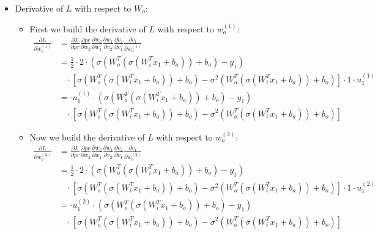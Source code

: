 \documentclass[a4paper]{article}
\begin{document}
\begin{itemize}
            \item Derivative of $L$ with respect to $W_o$:
                \begin{itemize}
                    \item First we build the derivative of $L$ with respect to $w_o^{(1)}$:
                        \begin{align*}
                            \frac{\partial L}{\partial w_o^{(1)}} &= \frac{\partial L}{\partial pr} \frac{\partial pr}{\partial w_2} 
                            \frac{\partial w_2}{\partial w_1} \frac{\partial w_1}{\partial v_2} \frac{\partial v_2}{\partial v_1}
                            \frac{\partial v_1}{\partial w_o^{(1)}}\\
                            &= \frac{1}{2} \cdot 2 \cdot (\sigma(W_o^T(\sigma(W_i^T x_1 + b_a)) + b_o) - y_1)\\
                            &\ \ \ \ \cdot [\sigma(W_o^T(\sigma(W_i^T x_1 + b_a)) + b_o) - \sigma^2(W_o^T(\sigma(W_i^T x_1 + b_a)) + b_o)] \cdot 1 \cdot u_1^{(1)}\\
                            &= \cdot u_1^{(1)} \cdot (\sigma(W_o^T(\sigma(W_i^T x_1 + b_a)) + b_o) - y_1)\\
                            &\ \ \ \ \cdot [\sigma(W_o^T(\sigma(W_i^T x_1 + b_a)) + b_o) - \sigma^2(W_o^T(\sigma(W_i^T x_1 + b_a)) + b_o)]
                        \end{align*}
                    \item Now we build the derivative of $L$ with respect to $w_o^{(2)}$:
                        \begin{align*}
                            \frac{\partial L}{\partial w_o^{(2)}} &= \frac{\partial L}{\partial pr} \frac{\partial pr}{\partial w_2} 
                            \frac{\partial w_2}{\partial w_1} \frac{\partial w_1}{\partial v_2} \frac{\partial v_2}{\partial v_1}
                            \frac{\partial v_1}{\partial w_o^{(2)}}\\
                            &= \frac{1}{2} \cdot 2 \cdot (\sigma(W_o^T(\sigma(W_i^T x_1 + b_a)) + b_o) - y_1)\\
                            &\ \ \ \ \cdot [\sigma(W_o^T(\sigma(W_i^T x_1 + b_a)) + b_o) - \sigma^2(W_o^T(\sigma(W_i^T x_1 + b_a)) + b_o)] \cdot 1 \cdot u_1^{(2)}\\
                            &= \cdot u_1^{(2)} \cdot (\sigma(W_o^T(\sigma(W_i^T x_1 + b_a)) + b_o) - y_1)\\
                            &\ \ \ \ \cdot [\sigma(W_o^T(\sigma(W_i^T x_1 + b_a)) + b_o) - \sigma^2(W_o^T(\sigma(W_i^T x_1 + b_a)) + b_o)]
                        \end{align*}
                \end{itemize}
            

\end{itemize}
\end{document}
